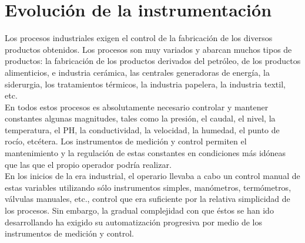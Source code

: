 \documentclass[12pt,letterpaper, onecolumn, titlepage, oneside]{book}
\begin{document}
\section{Evolución de la instrumentación }
Los procesos industriales exigen el control de la fabricación de los diversos productos obtenidos. Los procesos son muy variados y abarcan muchos tipos de productos: la fabricación de los productos derivados del petróleo, de los productos alimenticios, e industria cerámica, las centrales generadoras de
energía, la siderurgia, los tratamientos térmicos, la industria papelera, la industria textil, etc.\\

En todos estos procesos es absolutamente necesario controlar y mantener constantes algunas magnitudes, tales
como la presión, el caudal, el nivel, la temperatura, el PH, la conductividad, la velocidad, la humedad, el punto
de rocío, etcétera. Los instrumentos de medición y control permiten el mantenimiento y la regulación de estas
constantes en condiciones más idóneas que las que el propio operador podría realizar.\\

En los inicios de la era industrial, el operario llevaba a cabo un control manual de estas variables utilizando sólo instrumentos simples, manómetros, termómetros, válvulas manuales, etc., control que era suficiente por la relativa simplicidad de los procesos. Sin embargo, la gradual complejidad con que éstos se han ido
desarrollando ha exigido su automatización progresiva por medio de los instrumentos de medición y control.\\
\end{document}
